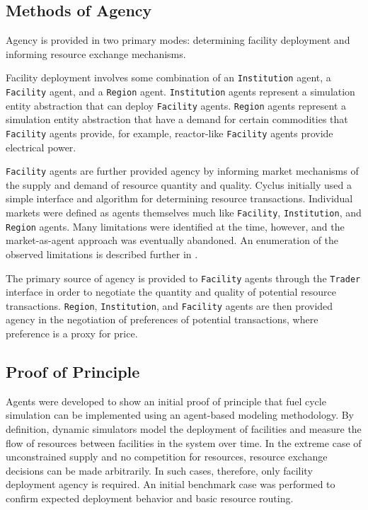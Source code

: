 \subsection{Methods of Agency}\label{abm:abm:agent}

Agency is provided in two primary modes: determining facility deployment and
informing resource exchange mechanisms. 

Facility deployment involves some combination of an \texttt{Institution} agent, a
\texttt{Facility} agent, and a \texttt{Region} agent. \texttt{Institution} agents
represent a simulation entity abstraction that can deploy \texttt{Facility}
agents. \texttt{Region} agents represent a simulation entity abstraction that have
a demand for certain commodities that \texttt{Facility} agents provide, for
example, reactor-like \texttt{Facility} agents provide electrical power.

\texttt{Facility} agents are further provided agency by informing market
mechanisms of the supply and demand of resource quantity and quality. Cyclus
initially used a simple interface and algorithm for determining resource
transactions. Individual markets were defined as agents themselves much like
\texttt{Facility}, \texttt{Institution}, and \texttt{Region} agents. Many limitations
were identified at the time, however, and the market-as-agent approach was
eventually abandoned. An enumeration of the observed limitations is described
further in .

The primary source of agency is provided to \texttt{Facility} agents through the
\texttt{Trader} interface in order to negotiate the quantity and quality of
potential resource transactions. \texttt{Region}, \texttt{Institution}, and
\texttt{Facility} agents are then provided agency in the negotiation of
preferences of potential transactions, where preference is a proxy for price.

\subsection{Proof of Principle}\label{abm:abm:proof}

Agents were developed to show an initial proof of principle that fuel cycle
simulation can be implemented using an agent-based modeling methodology. By
definition, dynamic simulators model the deployment of facilities and measure
the flow of resources between facilities in the system over time. In the extreme
case of unconstrained supply and no competition for resources, resource exchange
decisions can be made arbitrarily. In such cases, therefore, only facility
deployment agency is required. An initial benchmark case was performed to
confirm expected deployment behavior and basic resource routing.

